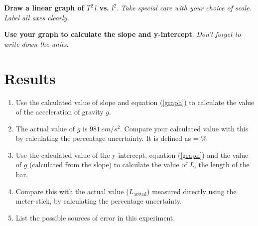 \documentclass{article}
\begin{document}
      \textbf{Draw a linear graph of $T^2 \, l$ vs. $l^2$}. \textit{Take special care with your choice of scale. Label all axes clearly.}

      \textbf{Use your graph to calculate the slope and y-intercept}. \textit{Don't forget to write down the units}.


   \section*{Results}

      \begin{enumerate}

         \item Use the calculated value of slope and equation (\ref{graph}) to calculate the value of the acceleration of gravity $g$.
         
         \item The actual value of $g$ is $981 \, cm/s^2$. Compare your calculated value with this by calculating the percentage uncertainty. It is defined as
         \beq
          =   \%
         \eeq

         \item Use the calculated value of the y-intercept, equation (\ref{graph}) and the value of $g$ (calculated from the slope) to calculate the value of $L$, the length of the bar.

         \item Compare this with the actual value ($L_\text{actual}$) measured directly using the meter-stick, by calculating the percentage uncertainty.

         \item List the possible sources of error in this experiment.

   \end{enumerate}
\end{document}
